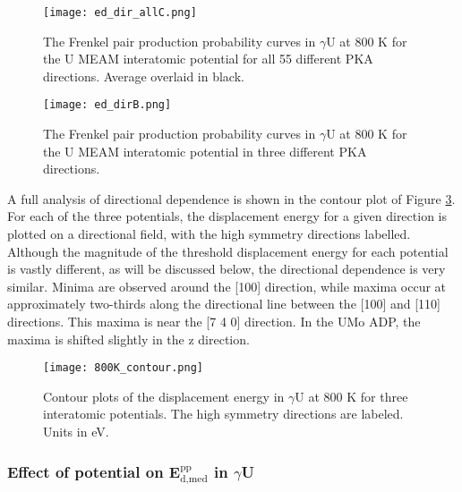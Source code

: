 \documentclass[review]{elsarticle}
\begin{document}
 \begin{figure}[h]
 \centering
 \texttt{[image: ed\_dir\_allC.png]} 
 \caption{The Frenkel pair production probability curves in $\gamma$U at 800 K for the U MEAM interatomic potential for all 55 different PKA directions. Average overlaid in black.}
 \label{fig:ed_dirall}
\end{figure}
 
\begin{figure}[h]
 \centering
 \texttt{[image: ed\_dirB.png]} 
 \caption{The Frenkel pair production probability curves in $\gamma$U at 800 K for the U MEAM interatomic potential in three different PKA directions.}
 \label{fig:ed_dir}
\end{figure}

\FloatBarrier

A full analysis of directional dependence is shown in the contour plot of Figure \ref{fig:800Kcontour}. For each of the three potentials, the displacement energy for a given direction is plotted on a directional field, with the high symmetry directions labelled. Although the magnitude of the threshold displacement energy for each potential is vastly different, as will be discussed below, the directional dependence is very similar. Minima are observed around the [100] direction, while maxima occur at approximately two-thirds along the directional line between the [100] and [110] directions. This maxima is near the [7 4 0] direction. In the UMo ADP, the maxima is shifted slightly in the z direction. 

\begin{figure}[h]
 \centering
 \texttt{[image: 800K\_contour.png]} 
 \caption{Contour plots of the displacement energy in $\gamma$U at 800 K for three interatomic potentials. The high symmetry directions are labeled. Units in eV.}
 \label{fig:800Kcontour}
\end{figure}

\FloatBarrier

\subsubsection{Effect of potential on E$^{\textrm{pp}}_{\textrm{d,med}}$ in $\gamma$U}
\end{document}
